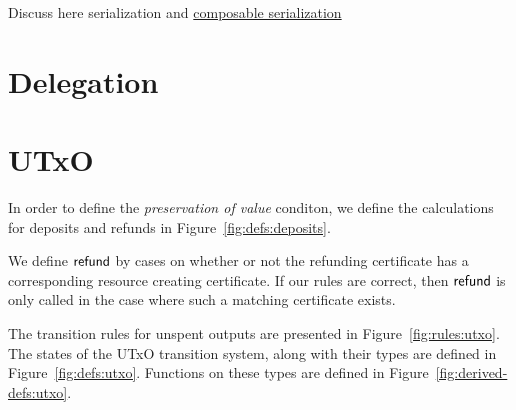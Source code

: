 \documentclass[11pt,a4paper]{article}
\theoremstyle{definition}
\theoremstyle{definition}
\begin{document}
\begin{todo}
  Discuss here serialization and
  \href{https://iohk.myjetbrains.com/youtrack/issue/CDEC-628}{composable
    serialization}
\end{todo}

\section{Delegation}
\label{sec:delegation}


\section{UTxO}
\label{sec:state-trans-utxo-1}

In order to define the \textit{preservation of value} conditon,
we define the calculations for deposits and refunds in
Figure~\ref{fig:defs:deposits}.

\begin{note}
  We define $\mathsf{refund}$ by cases on whether or not
  the refunding certificate has a corresponding
  resource creating certificate.
  If our rules are correct, then $\mathsf{refund}$
  is only called in the case where such a matching
  certificate exists.
\end{note}

The transition rules for unspent outputs are presented in
Figure~\ref{fig:rules:utxo}. The states of the UTxO transition system,
along with their types are defined in Figure~\ref{fig:defs:utxo}.
Functions on these types are defined in Figure~\ref{fig:derived-defs:utxo}.
\end{document}

